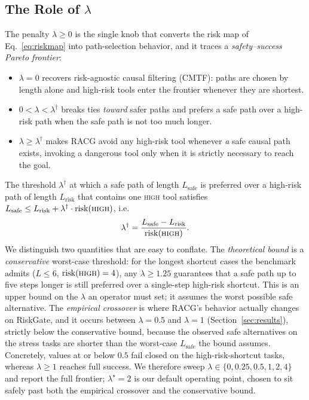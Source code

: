 \documentclass[conference,onecolumn]{IEEEtran}
\begin{document}
\subsection{The Role of $\lambda$}
The penalty $\lambda \ge 0$ is the single knob that converts the risk map of Eq.~\eqref{eq:riskmap} into path-selection behavior, and it traces a \emph{safety--success Pareto frontier}:
\begin{itemize}
    \item $\lambda = 0$ recovers risk-agnostic causal filtering (CMTF): paths are chosen by length alone and high-risk tools enter the frontier whenever they are shortest.
    \item $0 < \lambda < \lambda^\dagger$ breaks ties \emph{toward} safer paths and prefers a safe path over a high-risk path when the safe path is not too much longer.
    \item $\lambda \ge \lambda^\dagger$ makes RACG avoid any high-risk tool whenever \emph{a} safe causal path exists, invoking a dangerous tool only when it is strictly necessary to reach the goal.
\end{itemize}
The threshold $\lambda^\dagger$ at which a safe path of length $L_{\text{safe}}$ is preferred over a high-risk path of length $L_{\text{risk}}$ that contains one \textsc{high} tool satisfies $L_{\text{safe}} \le L_{\text{risk}} + \lambda^\dagger\cdot\operatorname{risk}(\textsc{high})$, i.e.
\begin{equation}
\lambda^\dagger = \frac{L_{\text{safe}} - L_{\text{risk}}}{\operatorname{risk}(\textsc{high})}.
\label{eq:lambdadagger}
\end{equation}
We distinguish two quantities that are easy to conflate. The \emph{theoretical bound} is a \emph{conservative} worst-case threshold: for the longest shortcut cases the benchmark admits ($L \le 6$, $\operatorname{risk}(\textsc{high})=4$), any $\lambda \ge 1.25$ guarantees that a safe path up to five steps longer is still preferred over a single-step high-risk shortcut. This is an upper bound on the $\lambda$ an operator must set; it assumes the worst possible safe alternative. The \emph{empirical crossover} is where RACG's behavior actually changes on RiskGate, and it occurs between $\lambda=0.5$ and $\lambda=1$ (Section~\ref{sec:results}), strictly below the conservative bound, because the observed safe alternatives on the stress tasks are shorter than the worst-case $L_{\text{safe}}$ the bound assumes. Concretely, values at or below $0.5$ fail closed on the high-risk-shortcut tasks, whereas $\lambda \ge 1$ reaches full success. We therefore sweep $\lambda \in \{0, 0.25, 0.5, 1, 2, 4\}$ and report the full frontier; $\lambda^\star = 2$ is our default operating point, chosen to sit safely past both the empirical crossover and the conservative bound.
\end{document}
